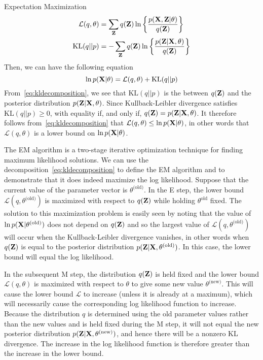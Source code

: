 \documentclass[9pt]{article}
\begin{document}
\begin{topic}{em}{Expectation Maximization}
\[\begin{split}
\mathcal{L}(q,\theta) &= \sum_{\mathbf{Z}} q(\mathbf{Z})\ln \bigg\{\frac{p(\mathbf{X},\mathbf{Z}|\theta)}{q(\mathbf{Z})}\bigg\}\\
\text{KL}(q||p) &= - \sum_{\mathbf{Z}} q(\mathbf{Z})\ln \bigg\{\frac{p(\mathbf{Z}|\mathbf{X},\theta)}{q(\mathbf{Z})}\bigg\}
\end{split}
\]
Then, we can have the following equation
\begin{equation}
\label{eq:kldecomposition}
\ln p(\mathbf{X}|\theta) = \mathcal{L}(q,\theta) + \text{KL}(q||p)
\end{equation}
From~\ref{eq:kldecomposition}, we see that $\text{KL}(q||p)$ is the  between $q(\mathbf{Z})$ and the posterior distribution $p(\mathbf{Z}|\mathbf{X}, \theta)$. Since Kullback-Leibler divergence satisfies $\text{KL}(q||p)\geq 0$, with equality if, and only if, $q(\mathbf{Z}) = p(\mathbf{Z}|\mathbf{X}, \theta)$. It therefore follows from~\ref{eq:kldecomposition} that $\mathcal{L}(q,\theta) \leq \ln p(\mathbf{X}|\theta)$, in other words that $\mathcal{L}(q,\theta)$ is a lower bound on $\ln p(\mathbf{X}|\theta)$.

The EM algorithm is a two-stage iterative optimization technique for finding maximum likelihood solutions. We can use the decomposition~\ref{eq:kldecomposition} to define the EM algorithm and to demonstrate that it does indeed maximize the log likelihood. Suppose that the current value of the parameter vector is $\theta^\text{(old)}$. In the E step, the lower bound $\mathcal{L}(q,\theta^\text{(old)})$ is maximized with respect to $q(\mathbf{Z})$ while holding $\theta^\text{old}$ fixed. The solution to this maximization problem is easily seen by noting that the value of $\ln p(\mathbf{X}|\theta^\text{(old)})$ does not depend on $q(\mathbf{Z})$ and so the largest value of $\mathcal{L}(q,\theta^\text{(old)})$ will occur when the Kullback-Leibler divergence vanishes, in other words when $q(\mathbf{Z})$ is equal to the posterior distribution $p(\mathbf{Z}|\mathbf{X},\theta^\text{(old)})$. In this case, the lower bound will equal the log likelihood.

In the subsequent M step, the distribution $q(\mathbf{Z})$ is held fixed and the lower bound $\mathcal{L}(q,\theta)$ is maximized with respect to $\theta$ to give some new value $\theta^\text{(new)}$. This will cause the lower bound $\mathcal{L}$ to increase (unless it is already at a maximum), which will necessarily cause the corresponding log likelihood function to increase. Because the distribution $q$ is determined using the old parameter values rather than the new values and is held fixed during the M step, it will not equal the new posterior distribution $p(\mathbf{Z}|\mathbf{X},\theta^\text{(new)})$, and hence there will be a nonzero KL divergence. The increase in the log likelihood function is therefore greater than the increase in the lower bound.
\end{topic}
\end{document}
